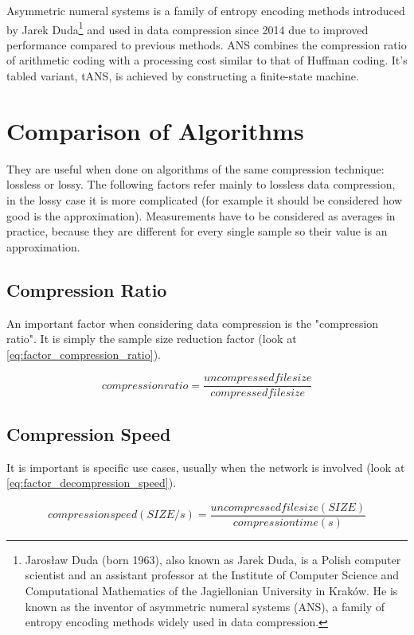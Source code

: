 \documentclass[12pt, a4paper]{report}
\begin{document}
Asymmetric numeral systems is a family of entropy encoding methods introduced by Jarek Duda\footnote{Jarosław Duda (born 1963),
also known as Jarek Duda, is a Polish computer scientist and an assistant professor at the Institute of Computer Science and
Computational Mathematics of the Jagiellonian University in Kraków. He is known as the inventor of asymmetric numeral systems
(ANS), a family of entropy encoding methods widely used in data compression.} and used in data compression since 2014 due to
improved performance compared to previous methods.
ANS combines the compression ratio of arithmetic coding with a processing cost similar to that of Huffman coding.
It's tabled variant, tANS, is achieved by constructing a finite-state machine.

\section{Comparison of Algorithms}

They are useful when done on algorithms of the same compression technique: lossless or lossy.
The following factors refer mainly to lossless data compression, in the lossy case it is more complicated (for example it should
be considered how good is the approximation).
Measurements have to be considered as averages in practice, because they are different for every single sample so their value is
an approximation.

\subsection{Compression Ratio}

An important factor when considering data compression is the "compression ratio". It is simply the sample size reduction factor
(look at \autoref{eq:factor_compression_ratio}).

\begin{equation} \label{eq:factor_compression_ratio}
  compression ratio = \frac{uncompressed file size}{compressed file size}
\end{equation}

\subsection{Compression Speed}

It is important is specific use cases, usually when the network is involved (look at \autoref{eq:factor_decompression_speed}).

\begin{equation} \label{eq:factor_compression_speed}
  compression speed (SIZE / s) = \frac{uncompressed file size (SIZE)}{compression time (s)}
\end{equation}
\end{document}
